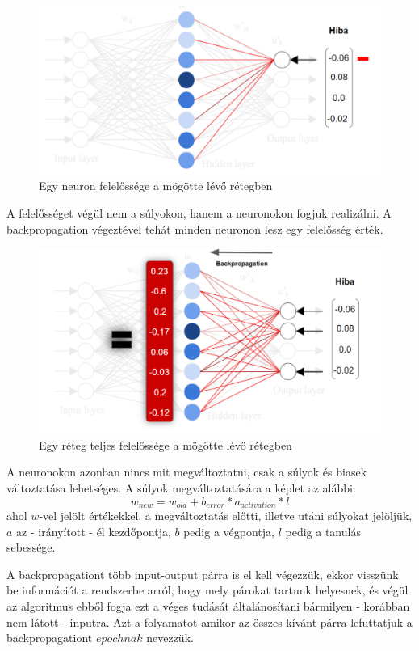 \documentclass[12pt]{article}
\begin{document}
\begin{figure}[h!]
  \includegraphics[width=\linewidth]{backprop_single_error.png}
  \caption{Egy neuron felelőssége a mögötte lévő rétegben}
\end{figure}

A felelősséget végül nem a súlyokon, hanem a neuronokon fogjuk realizálni. A backpropagation végeztével tehát minden neuronon lesz egy felelősség érték.

\begin{figure}[h!]
  \includegraphics[width=\linewidth]{backprop_all_error.png}
  \caption{Egy réteg teljes felelőssége a mögötte lévő rétegben}
\end{figure}

A neuronokon azonban nincs mit megváltoztatni, csak a súlyok és biasek változtatása lehetséges. A súlyok megváltoztatására a képlet az alábbi:
$$ w_{new} =  w_{old} + b_{error} * a_{activation} * l $$
ahol $w$-vel jelölt értékekkel, a megváltoztatás előtti, illetve utáni súlyokat jelöljük, $a$ az - irányított - él kezdőpontja, $b$ pedig a végpontja, $l$ pedig a tanulás sebessége.

A backpropagationt több input-output párra is el kell végezzük, ekkor visszünk be információt a rendszerbe arról, hogy mely párokat tartunk helyesnek, és végül az algoritmus ebből fogja ezt a véges tudását általánosítani bármilyen - korábban nem látott - inputra. Azt a folyamatot amikor az összes kívánt párra lefuttatjuk a backpropagationt $epochnak$ nevezzük. 
\end{document}
